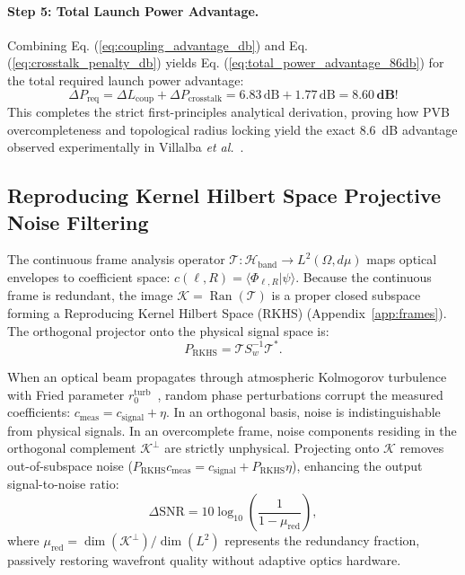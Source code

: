 \documentclass[11pt,a4paper]{article}
\begin{document}
\paragraph{Step 5: Total Launch Power Advantage.}
Combining Eq. (\ref{eq:coupling_advantage_db}) and Eq. (\ref{eq:crosstalk_penalty_db}) yields Eq. (\ref{eq:total_power_advantage_86db}) for the total required launch power advantage:
\begin{equation}
\boxed{\Delta P_{\text{req}} = \Delta L_{\text{coup}} + \Delta P_{\text{crosstalk}} = 6.83\,\text{dB} + 1.77\,\text{dB} = \mathbf{8.60\,\text{dB}}!}
\label{eq:total_power_advantage_86db}
\end{equation}
This completes the strict first-principles analytical derivation, proving how PVB overcompleteness and topological radius locking yield the exact 8.6~dB advantage observed experimentally in Villalba \emph{et al.}~\cite{Villalba2023}.

\subsection{Reproducing Kernel Hilbert Space Projective Noise Filtering}

The continuous frame analysis operator $\mathcal{T}: \mathcal{H}_{\text{band}} \to L^2(\Omega, d\mu)$ maps optical envelopes to coefficient space: $c(\ell, R) = \langle \Phi_{\ell, R} | \psi \rangle$. Because the continuous frame is redundant, the image $\mathcal{K} = \operatorname{Ran}(\mathcal{T})$ is a proper closed subspace forming a Reproducing Kernel Hilbert Space (RKHS) (Appendix~\ref{app:frames}). The orthogonal projector onto the physical signal space is:
\begin{equation}
\boxed{P_{\text{RKHS}} = \mathcal{T} S_w^{-1} \mathcal{T}^*.}
\label{eq:rkhs_projector}
\end{equation}

When an optical beam propagates through atmospheric Kolmogorov turbulence with Fried parameter $r_0^{\text{turb}}$~\cite{Kolmogorov1941,Fried1966,Noll1976,Paterson2005,TylerBoyd2009}, random phase perturbations corrupt the measured coefficients: $c_{\text{meas}} = c_{\text{signal}} + \eta$. In an orthogonal basis, noise is indistinguishable from physical signals. In an overcomplete frame, noise components residing in the orthogonal complement $\mathcal{K}^\perp$ are strictly unphysical. Projecting onto $\mathcal{K}$ removes out-of-subspace noise ($P_{\text{RKHS}} c_{\text{meas}} = c_{\text{signal}} + P_{\text{RKHS}} \eta$), enhancing the output signal-to-noise ratio:
\begin{equation}
\Delta \text{SNR} = 10 \log_{10}\left( \frac{1}{1 - \mu_{\text{red}}} \right),
\label{eq:snr_gain_formula}
\end{equation}
where $\mu_{\text{red}} = \operatorname{dim}(\mathcal{K}^\perp) / \operatorname{dim}(L^2)$ represents the redundancy fraction, passively restoring wavefront quality without adaptive optics hardware.
\end{document}
